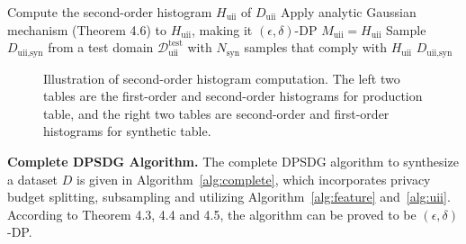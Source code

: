 \documentclass[11pt]{article}
\begin{document}
\begin{algorithm}[h]
\caption{Differentially-Private Synthetic Data Generation for UII columns DPUII}
\label{alg:uii}
\begin{algorithmic}[1]
\State Compute the second-order histogram $H_{\text{uii}}$ of $D_{\text{uii}}$
\State Apply analytic Gaussian mechanism (Theorem 4.6) to $H_{\text{uii}}$,
  making it $(\epsilon,\delta)$-DP
\State \Return $M_{\text{uii}} = H_{\text{uii}}$
\EndProcedure
{}
\State Sample $D_{\text{uii},\text{syn}}$ from a test domain $\mathcal{D}^{\text{test}}_{\text{uii}}$
  with $N_{\text{syn}}$ samples that comply with $H_{\text{uii}}$
\State \Return $D_{\text{uii},\text{syn}}$
\EndProcedure
\end{algorithmic}
\end{algorithm}

\begin{figure}[h]
\centering
{}
\caption{Illustration of second-order histogram computation. The left two tables are the first-order and second-order histograms for production table, and the right two tables are second-order and first-order histograms for synthetic table.}
\label{fig:hist}
\end{figure}

\textbf{Complete DPSDG Algorithm.} The complete DPSDG algorithm
to synthesize a dataset $D$ is given in Algorithm~\ref{alg:complete}, which incorporates
privacy budget splitting, subsampling and utilizing Algorithm~\ref{alg:feature}
and~\ref{alg:uii}. According to Theorem 4.3, 4.4 and 4.5, the algorithm can
be proved to be $(\epsilon,\delta)$-DP.
\end{document}
